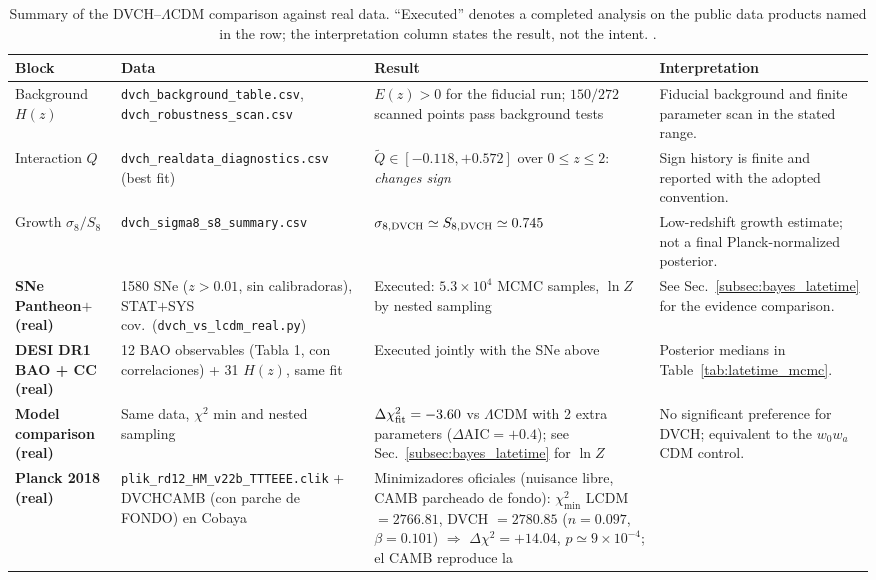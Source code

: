 \documentclass[pdflatex,sn-mathphys-num]{sn-jnl}%
\begin{document}
\begin{table}[t]
\centering
\caption{Summary of the DVCH--$\Lambda$CDM comparison against real data.
``Executed'' denotes a completed analysis on the public data products named
in the row; the interpretation column states the result, not the intent.
\cite{Aghanim:2018eyx,Planck:2019nip,Adame:2024ywp,Brout2022,Moresco:2016mzx}.}
\label{tab:final_global_status}
\scriptsize
\begin{tabular}{p{}p{}p{}p{}}
\toprule
Block & Data & Result & Interpretation \\
\midrule
Background $H(z)$ & \texttt{dvch\_background\_table.csv}, \texttt{dvch\_robustness\_scan.csv} &
$E(z)>0$ for the fiducial run; $150/272$ scanned points pass background tests &
Fiducial background and finite parameter scan in the stated range. \\
Interaction $Q$ & \texttt{dvch\_realdata\_diagnostics.csv} (best fit) &
$\widetilde Q\in[-0.118,+0.572]$ over $0\le z\le2$: \emph{changes sign} &
Sign history is finite and reported with the adopted convention. \\
Growth $\sigma_8/S_8$ & \texttt{dvch\_sigma8\_s8\_summary.csv} &
$\sigma_{8,\rm DVCH}\simeq S_{8,\rm DVCH}\simeq0.745$ &
Low-redshift growth estimate; not a final Planck-normalized posterior. \\
\textbf{SNe Pantheon$+$ (real)} & 1580 SNe ($z>0.01$, sin calibradoras), STAT$+$SYS cov.\ (\texttt{dvch\_vs\_lcdm\_real.py}) &
Executed: $5.3\times10^4$ MCMC samples, $\ln Z$ by nested sampling &
See Sec.~\ref{subsec:bayes_latetime} for the evidence comparison. \\
\textbf{DESI DR1 BAO + CC (real)} & 12 BAO observables (Tabla 1, con correlaciones) + 31 $H(z)$, same fit &
Executed jointly with the SNe above &
Posterior medians in Table~\ref{tab:latetime_mcmc}. \\
\textbf{Model comparison (real)} & Same data, $\chi^2$ min and nested sampling &
$\Delta\chi^2_{\rm fit}=-3.60$ vs $\Lambda$CDM with 2 extra parameters
($\Delta\mathrm{AIC}=+0.4$); see Sec.~\ref{subsec:bayes_latetime} for $\ln Z$ &
No significant preference for DVCH; equivalent to the $w_0w_a$CDM control. \\
\textbf{Planck 2018 (real)} & \texttt{plik\_rd12\_HM\_v22b\_TTTEEE.clik} + DVCHCAMB (con parche de FONDO) en Cobaya &
Minimizadores oficiales (nuisance libre, CAMB parcheado de fondo):
$\chi^2_{\min}$ LCDM $=2766.81$, DVCH $=2780.85$ ($n=0.097$, $\beta=0.101$) $\Rightarrow$
$\Delta\chi^2=+14.04$, $p\simeq9\times10^{-4}$; el CAMB reproduce la

\end{tabular}
\end{table}
\end{document}
